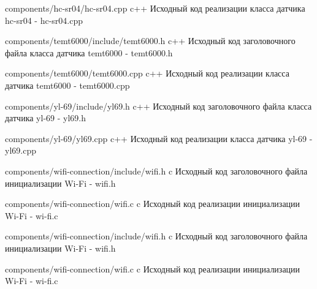 \documentclass{bmstu}
\begin{document}
\begin{appendices}
        {components/hc-sr04/hc-sr04.cpp} %
        {c++}
        {Исходный код реализации класса датчика hc-sr04 - hc-sr04.cpp} %

        {components/temt6000/include/temt6000.h} %
        {c++}
        {Исходный код заголовочного файла класса датчика temt6000 - temt6000.h} %

        {components/temt6000/temt6000.cpp} %
        {c++}
        {Исходный код реализации класса датчика temt6000 - temt6000.cpp} %


        {components/yl-69/include/yl69.h} %
        {c++}
        {Исходный код заголовочного файла класса датчика yl-69 - yl69.h} %

        {components/yl-69/yl69.cpp} %
        {c++}
        {Исходный код реализации класса датчика yl-69 - yl69.cpp} %


        {components/wifi-connection/include/wifi.h} %
        {c}
        {Исходный код заголовочного файла инициализации Wi-Fi - wifi.h} %

        {components/wifi-connection/wifi.c} %
        {c}
        {Исходный код реализации инициализации Wi-Fi - wi-fi.c} %

        {components/wifi-connection/include/wifi.h} %
        {c}
        {Исходный код заголовочного файла инициализации Wi-Fi - wifi.h} %

        {components/wifi-connection/wifi.c} %
        {c}
        {Исходный код реализации инициализации Wi-Fi - wi-fi.c} %



\end{appendices}
\end{document}
